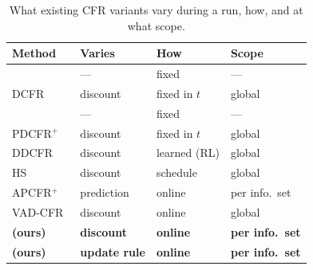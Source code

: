 \begin{table}[t]
\centering
\caption{What existing CFR variants vary during a run, how, and at what scope.}
\label{tab:prior}
\setlength{\tabcolsep}{3pt}
\begin{tabular}{@{}llll@{}}
\toprule
\textbf{Method} & \textbf{Varies} & \textbf{How} & \textbf{Scope} \\
\midrule
\cfrp{}~\cite{tammelin2015solving}         & ---        & fixed         & --- \\
DCFR~\cite{brown2019solving}               & discount   & fixed in $t$  & global \\
\pcfrp{}~\cite{farina2021faster}           & ---        & fixed         & --- \\
PDCFR$^+$~\cite{xu2024minimizing}          & discount   & fixed in $t$  & global \\
DDCFR~\cite{xu2024dynamic}                 & discount   & learned (RL)  & global \\
HS~\cite{zhang2026faster}                  & discount   & schedule      & global \\
APCFR$^+$~\cite{meng2025faster}            & prediction & online        & per info.\ set \\
VAD-CFR~\cite{li2026discovering}           & discount   & online        & global \\
\midrule
\textbf{\ours{} (ours)}                    & \textbf{discount} & \textbf{online} & \textbf{per info.\ set} \\
\textbf{\mix{} (ours)}                     & \textbf{update rule} & \textbf{online} & \textbf{per info.\ set} \\
\bottomrule
\end{tabular}
\end{table}
